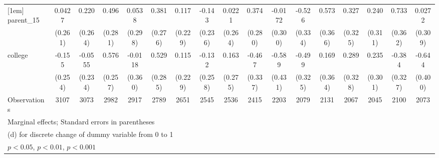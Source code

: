 {\begin{tabular}{l*{16}{c}}
[1em]
parent\_15           &      0.0427         &       0.220         &       0.496         &      0.0538         &       0.381         &       0.117         &      -0.143         &      0.0221         &       0.374         &     -0.0172         &      -0.526         &       0.573         &       0.327         &       0.240         &       0.733\sym{*}  &      0.0272         \\
                    &     (0.261)         &     (0.264)         &     (0.281)         &     (0.298)         &     (0.276)         &     (0.229)         &     (0.236)         &     (0.264)         &     (0.280)         &     (0.300)         &     (0.334)         &     (0.366)         &     (0.325)         &     (0.311)         &     (0.362)         &     (0.309)         \\
[1em]
college             &      -0.155         &     -0.0555         &       0.576\sym{*}  &     -0.0118         &       0.529         &       0.115         &      -0.132         &       0.163         &      -0.467         &      -0.589         &      -0.499         &       0.169         &       0.289         &       0.235         &      -0.384         &      -0.644         \\
                    &     (0.254)         &     (0.234)         &     (0.257)         &     (0.360)         &     (0.285)         &     (0.229)         &     (0.258)         &     (0.275)         &     (0.337)         &     (0.431)         &     (0.325)         &     (0.364)         &     (0.328)         &     (0.301)         &     (0.327)         &     (0.400)         \\
\hline
Observations        &        3107         &        3073         &        2982         &        2917         &        2789         &        2651         &        2545         &        2536         &        2415         &        2203         &        2079         &        2131         &        2067         &        2045         &        2100         &        2073         \\
\hline\hline
\multicolumn{17}{l}{\footnotesize Marginal effects; Standard errors in parentheses}\\
\multicolumn{17}{l}{\footnotesize  (d) for discrete change of dummy variable from 0 to 1}\\
\multicolumn{17}{l}{\footnotesize \sym{*} \(p<0.05\), \sym{**} \(p<0.01\), \sym{***} \(p<0.001\)}\\
\end{tabular}
}
